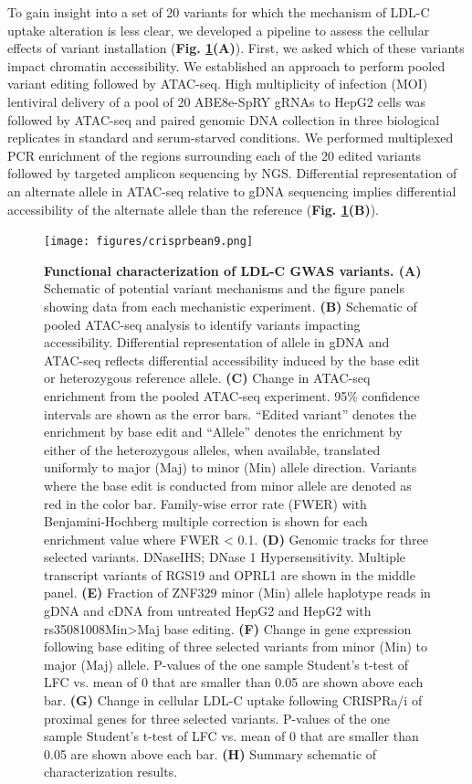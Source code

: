 \documentclass[a4paper, titlepage, openright]{book}
\begin{document}
To gain insight into a set of 20 variants for which the mechanism of LDL-C uptake alteration is less clear, we developed a pipeline to assess the cellular effects of variant installation (\textbf{Fig. \ref{fig:crisprbean9}(A)}). First, we asked which of these variants impact chromatin accessibility. We established an approach to perform pooled variant editing followed by ATAC-seq. High multiplicity of infection (MOI) lentiviral delivery of a pool of 20 ABE8e-SpRY gRNAs to HepG2 cells was followed by ATAC-seq and paired genomic DNA collection in three biological replicates in standard and serum-starved conditions. We performed multiplexed PCR enrichment of the regions surrounding each of the 20 edited variants followed by targeted amplicon sequencing by NGS. Differential representation of an alternate allele in ATAC-seq relative to gDNA sequencing implies differential accessibility of the alternate allele than the reference (\textbf{Fig. \ref{fig:crisprbean9}(B)}).
\begin{figure}
	\centering
	\texttt{[image: figures/crisprbean9.png]}
	\caption[Functional characterization of LDL-C GWAS variants]{\textbf{Functional characterization of LDL-C GWAS variants.  (A)} Schematic of potential variant mechanisms and the figure panels showing data from each mechanistic experiment. \textbf{(B)} Schematic of pooled ATAC-seq analysis to identify variants impacting accessibility. Differential representation of allele in gDNA and ATAC-seq reflects differential accessibility induced by the base edit or heterozygous reference allele. \textbf{(C)} Change in ATAC-seq enrichment from the pooled ATAC-seq experiment. 95\% confidence intervals are shown as the error bars. “Edited variant” denotes the enrichment by base edit and “Allele” denotes the enrichment by either of the heterozygous alleles, when available, translated uniformly to major (Maj) to minor (Min) allele direction. Variants where the base edit is conducted from minor allele are denoted as red in the color bar. Family-wise error rate (FWER) with Benjamini-Hochberg multiple correction is shown for each enrichment value where FWER < 0.1. \textbf{(D)} Genomic tracks for three selected variants. DNaseIHS; DNase 1 Hypersensitivity. Multiple transcript variants of RGS19 and OPRL1 are shown in the middle panel. \textbf{(E)} Fraction of ZNF329 minor (Min) allele haplotype reads in gDNA and cDNA from untreated HepG2 and HepG2 with rs35081008Min>Maj base editing.  \textbf{(F)} Change in gene expression following base editing of three selected variants from minor (Min) to major (Maj) allele. P-values of the one sample Student’s t-test of LFC vs. mean of 0 that are smaller than 0.05 are shown above each bar. \textbf{(G)} Change in cellular LDL-C uptake following CRISPRa/i of proximal genes for three selected variants. P-values of the one sample Student’s t-test of LFC vs. mean of 0 that are smaller than 0.05 are shown above each bar. \textbf{(H)} Summary schematic of characterization results.}
	\label{fig:crisprbean9}
\end{figure} 
\end{document}

